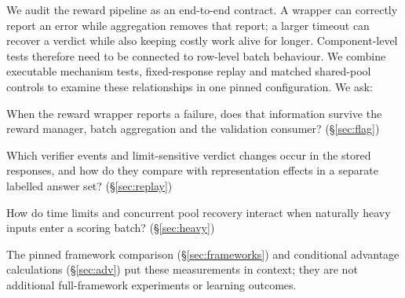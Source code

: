 \documentclass[11pt,a4paper]{article}
\begin{document}
We audit the reward pipeline as an end-to-end contract. A wrapper can correctly report an error while aggregation removes that report; a larger timeout can recover a verdict while also keeping costly work alive for longer. Component-level tests therefore need to be connected to row-level batch behaviour. We combine executable mechanism tests, fixed-response replay and matched shared-pool controls to examine these relationships in one pinned configuration. We ask:
\begin{description}[leftmargin=3.2em,labelwidth=2.6em]
\item[RQ1] When the reward wrapper reports a failure, does that information survive the reward manager, batch aggregation and the validation consumer? (\S\ref{sec:flag})
\item[RQ2] Which verifier events and limit-sensitive verdict changes occur in the stored responses, and how do they compare with representation effects in a separate labelled answer set? (\S\ref{sec:replay})
\item[RQ3] How do time limits and concurrent pool recovery interact when naturally heavy inputs enter a scoring batch? (\S\ref{sec:heavy})
\end{description}
The pinned framework comparison (\S\ref{sec:frameworks}) and conditional advantage calculations (\S\ref{sec:adv}) put these measurements in context; they are not additional full-framework experiments or learning outcomes.
\end{document}
